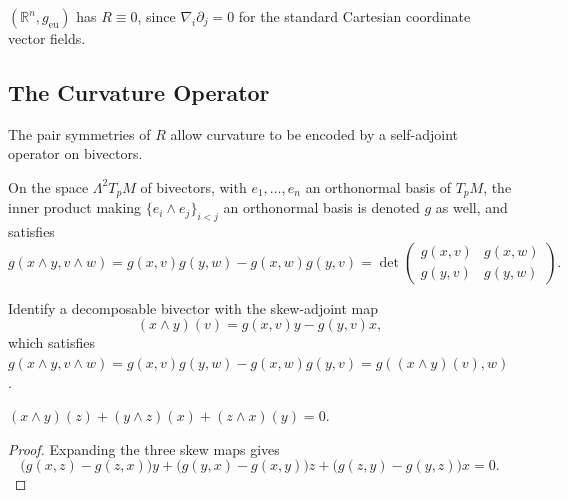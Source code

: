 \begin{example}
  \label{ex:pet-ch3-euclidean-flat}


  $(\mathbb R^n,g_{\mathrm{eu}})$ has $R\equiv0$, since $\nabla_i\partial_j=0$ for the
  standard Cartesian coordinate vector fields.
\end{example}

\subsection{The Curvature Operator}

The pair symmetries of $R$ allow curvature to be encoded by a self-adjoint
operator on bivectors.

\begin{definition}
  \label{def:pet-ch3-bivector-inner-product}


  On the space $\Lambda^2T_pM$ of bivectors, with $e_1,\dots,e_n$ an orthonormal
  basis of $T_pM$, the inner product making $\{e_i\wedge e_j\}_{i<j}$ an
  orthonormal basis is denoted $g$ as well, and satisfies
  \[
    g(x\wedge y,v\wedge w)=g(x,v)g(y,w)-g(x,w)g(y,v)
    =\det\begin{pmatrix}g(x,v)&g(x,w)\\g(y,v)&g(y,w)\end{pmatrix}.
  \]
\end{definition}

\begin{definition}
  \label{def:pet-ch3-bivector-skew-map}


  Identify a decomposable bivector with the skew-adjoint map
  \[
    (x\wedge y)(v)=g(x,v)y-g(y,v)x,
  \]
  which satisfies
  $g(x\wedge y,v\wedge w)=g(x,v)g(y,w)-g(x,w)g(y,v)=g((x\wedge y)(v),w)$.
\end{definition}

\begin{lemma}
  \label{lem:pet-ch3-bivector-jacobi-identity}


  $(x\wedge y)(z)+(y\wedge z)(x)+(z\wedge x)(y)=0$.
\end{lemma}
\begin{proof}

  \sketch
  Expanding the three skew maps gives
  \[
   \bigl(g(x,z)-g(z,x)\bigr)y+
   \bigl(g(y,x)-g(x,y)\bigr)z+
   \bigl(g(z,y)-g(y,z)\bigr)x=0.
  \]
\end{proof}

